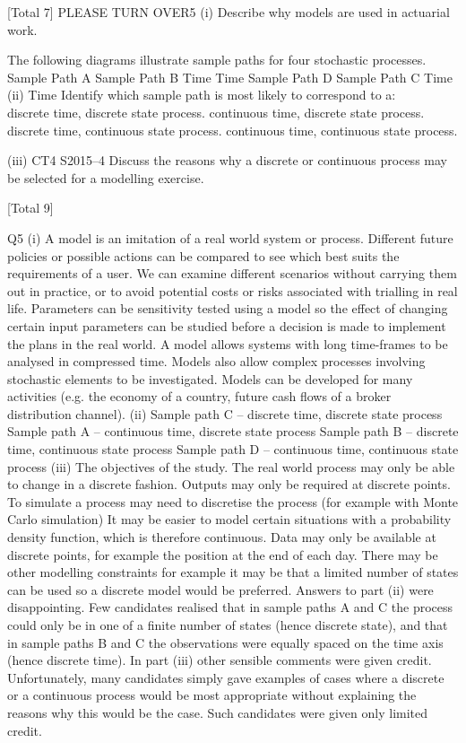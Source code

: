 [Total 7]
PLEASE TURN OVER5
(i)
Describe why models are used in actuarial work.

The following diagrams illustrate sample paths for four stochastic processes.
Sample Path A
Sample Path B
Time
Time
Sample Path D
Sample Path C
Time
(ii)
Time
Identify which sample path is most likely to correspond to a:




discrete time, discrete state process.
continuous time, discrete state process.
discrete time, continuous state process.
continuous time, continuous state process.

(iii)
CT4 S2015–4
Discuss the reasons why a discrete or continuous process may be selected for a
modelling exercise.

[Total 9]

Q5
(i)
A model is an imitation of a real world system or process.
Different future policies or possible actions can be compared to see which best
suits the requirements of a user.
We can examine different scenarios without carrying them out in practice, or
to avoid potential costs or risks associated with trialling in real life.
Parameters can be sensitivity tested using a model so the effect of changing
certain input parameters can be studied before a decision is made to implement
the plans in the real world.
A model allows systems with long time-frames to be analysed in compressed
time.
Models also allow complex processes involving stochastic elements to be
investigated.
Models can be developed for many activities (e.g. the economy of a country,
future cash flows of a broker distribution channel).
(ii) Sample path C – discrete time, discrete state process
Sample path A – continuous time, discrete state process
Sample path B – discrete time, continuous state process
Sample path D – continuous time, continuous state process
(iii) The objectives of the study.
The real world process may only be able to change in a discrete fashion.
Outputs may only be required at discrete points.
To simulate a process may need to discretise the process (for example with
Monte Carlo simulation)
It may be easier to model certain situations with a probability density function,
which is therefore continuous.
Data may only be available at discrete points, for example the position at the
end of each day.
There may be other modelling constraints for example it may be that a limited number of states can be used so a discrete model would be preferred.
Answers to part (ii) were disappointing. Few candidates realised that in sample paths A and C the process could only be in one of a finite number of
states (hence discrete state), and that in sample paths B and C the observations were equally spaced on the time axis (hence discrete time). In
part (iii) other sensible comments were given credit. Unfortunately, many candidates simply gave examples of cases where a discrete or a continuous
process would be most appropriate without explaining the reasons why this would be the case. Such candidates were given only limited credit.
